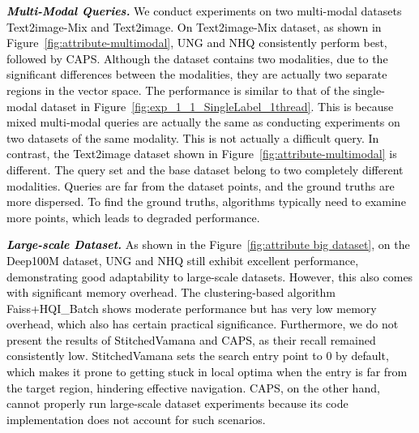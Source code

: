\documentclass[sigconf, nonacm, pdfa]{acmart}
\begin{document}
{%
	\textit{\textbf{\textcolor{black}{Multi-Modal Queries.}}} \textcolor{black}{
	We conduct experiments on two multi-modal  datasets Text2image-Mix and Text2image. 
On Text2image-Mix dataset, as shown in Figure~\ref{fig:attribute-multimodal}, UNG and NHQ consistently perform best, followed by CAPS.
Although the dataset contains two modalities, due to the significant differences between the modalities, they are actually two separate regions in the vector space. The performance is similar to that of the single-modal dataset in Figure~\ref{fig:exp_1_1_SingleLabel_1thread}. This is because mixed multi-modal queries are actually the same as conducting experiments on two datasets of the same modality. This is not actually a difficult query.
		In contrast, the Text2image dataset shown in Figure~\ref{fig:attribute-multimodal} is different. The query set and the base dataset belong to two completely different modalities. Queries are far from the dataset points, and the ground truths are more dispersed. To find the ground truths, algorithms typically need to examine more points, which leads to degraded performance.
	}
	
	\textit{\textbf{\textcolor{black}{Large-scale Dataset.}}} 
	\textcolor{black}{As shown in the Figure~\ref{fig:attribute big dataset}, on the Deep100M dataset, UNG and NHQ still exhibit excellent performance, demonstrating good adaptability to large-scale datasets. However, this also comes with significant memory overhead. The clustering-based algorithm Faiss+HQI\_Batch shows moderate performance but has very low memory overhead, which also has certain practical significance. Furthermore, we do not present the results of StitchedVamana and CAPS, as their recall remained consistently low. StitchedVamana sets the search entry point to 0 by default, which makes it prone to getting stuck in local optima when the entry is far from the target region, hindering effective navigation. CAPS, on the other hand, cannot properly run large-scale dataset experiments because its code implementation does not account for such scenarios.}
	
}
\end{document}
